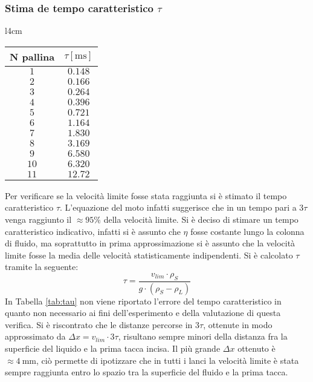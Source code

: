 \documentclass[a4paper,11pt,oneside]{article}
\begin{document}
\subsubsection*{Stima de tempo caratteristico $\tau$}
\begin{wraptable}{l}{4cm}
\centering
    \begin{tabular}{|c|c|}
        \hline
        \textbf{N pallina} & \textbf{$\tau [\si{\milli\second}]$} \\ \hline
        \rowcolor[rgb]{0.85,0.85,0.85}$1$ & $0.148$ \\ \hline
        $2$ & $0.166$ \\ \hline
        \rowcolor[rgb]{0.85,0.85,0.85}$3$ & $0.264$ \\ \hline
        $4$ & $0.396$ \\ \hline
        \rowcolor[rgb]{0.85,0.85,0.85}$5$ & $0.721$ \\ \hline
        $6$ & $1.164$ \\ \hline
        \rowcolor[rgb]{0.85,0.85,0.85}$7$ & $1.830$ \\ \hline
        $8$ & $3.169$ \\ \hline
        \rowcolor[rgb]{0.85,0.85,0.85}$9$ & $6.580$ \\ \hline
        $10$ & $6.320$ \\ \hline
        \rowcolor[rgb]{0.85,0.85,0.85}$11$ & $12.72$ \\ \hline
    \end{tabular}
    \caption{Tempo $\tau$}
    \label{tab:tau}
\end{wraptable}
Per verificare se la velocità limite fosse stata raggiunta si è stimato il tempo caratteristico $\tau$. L'equazione del moto infatti suggerisce che in un tempo pari a $3\tau$ venga raggiunto il $\approx 95\%$ della velocità limite.
Si è deciso di stimare un tempo caratteristico indicativo, infatti si è assunto che $\eta$ fosse costante lungo la colonna di fluido, ma soprattutto in prima approssimazione si è assunto che la velocità limite fosse la media delle velocità statisticamente indipendenti.
Si è calcolato $\tau$ tramite la seguente:
\begin{equation*}
    \tau = \frac{v_{lim} \cdot \rho_{S}}{g \cdot (\rho_{S} - \rho_{L})}
\end{equation*}
In Tabella \ref{tab:tau} non viene riportato l'errore del tempo caratteristico in quanto non necessario ai fini dell'esperimento e della valutazione di questa verifica. Si è riscontrato che le distanze percorse in $3\tau$, ottenute in modo approssimato da $\Delta x=v_{lim} \cdot 3 \tau$, risultano sempre minori della distanza fra la superficie del liquido e la prima tacca incisa. Il più grande $\Delta x$ ottenuto è $\approx \SI{4}{\milli\metre}$, ciò permette di ipotizzare che in tutti i lanci la velocità limite è stata sempre raggiunta entro lo spazio tra la superficie del fluido e la prima tacca.%
\end{document}

